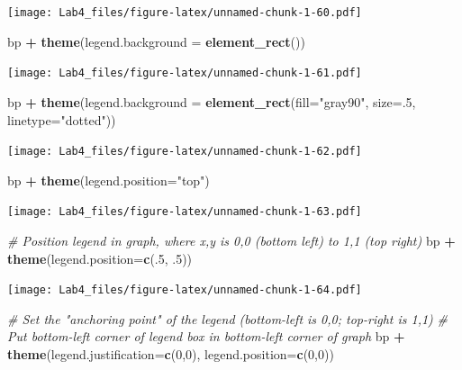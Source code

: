 \documentclass[]{article}
\newenvironment{Shaded}{\begin{snugshade}}{\end{snugshade}}
\newcommand{\KeywordTok}[1]{\textcolor[rgb]{0.13,0.29,0.53}{\textbf{#1}}}
\newcommand{\DataTypeTok}[1]{\textcolor[rgb]{0.13,0.29,0.53}{#1}}
\newcommand{\DecValTok}[1]{\textcolor[rgb]{0.00,0.00,0.81}{#1}}
\newcommand{\StringTok}[1]{\textcolor[rgb]{0.31,0.60,0.02}{#1}}
\newcommand{\CommentTok}[1]{\textcolor[rgb]{0.56,0.35,0.01}{\textit{#1}}}
\newcommand{\OperatorTok}[1]{\textcolor[rgb]{0.81,0.36,0.00}{\textbf{#1}}}
\newcommand{\NormalTok}[1]{#1}
\begin{document}
\texttt{[image: Lab4\_files/figure-latex/unnamed-chunk-1-60.pdf]}

\begin{Shaded}
\begin{Highlighting}[]
\NormalTok{bp }\OperatorTok{+}\StringTok{ }\KeywordTok{theme}\NormalTok{(}\DataTypeTok{legend.background =} \KeywordTok{element_rect}\NormalTok{())}
\end{Highlighting}
\end{Shaded}

\texttt{[image: Lab4\_files/figure-latex/unnamed-chunk-1-61.pdf]}

\begin{Shaded}
\begin{Highlighting}[]
\NormalTok{bp }\OperatorTok{+}\StringTok{ }\KeywordTok{theme}\NormalTok{(}\DataTypeTok{legend.background =} \KeywordTok{element_rect}\NormalTok{(}\DataTypeTok{fill=}\StringTok{"gray90"}\NormalTok{, }\DataTypeTok{size=}\NormalTok{.}\DecValTok{5}\NormalTok{, }\DataTypeTok{linetype=}\StringTok{"dotted"}\NormalTok{))}
\end{Highlighting}
\end{Shaded}

\texttt{[image: Lab4\_files/figure-latex/unnamed-chunk-1-62.pdf]}

\begin{Shaded}
\begin{Highlighting}[]
\NormalTok{bp }\OperatorTok{+}\StringTok{ }\KeywordTok{theme}\NormalTok{(}\DataTypeTok{legend.position=}\StringTok{"top"}\NormalTok{)}
\end{Highlighting}
\end{Shaded}

\texttt{[image: Lab4\_files/figure-latex/unnamed-chunk-1-63.pdf]}

\begin{Shaded}
\begin{Highlighting}[]
\CommentTok{# Position legend in graph, where x,y is 0,0 (bottom left) to 1,1 (top right)}
\NormalTok{bp }\OperatorTok{+}\StringTok{ }\KeywordTok{theme}\NormalTok{(}\DataTypeTok{legend.position=}\KeywordTok{c}\NormalTok{(.}\DecValTok{5}\NormalTok{, .}\DecValTok{5}\NormalTok{))}
\end{Highlighting}
\end{Shaded}

\texttt{[image: Lab4\_files/figure-latex/unnamed-chunk-1-64.pdf]}

\begin{Shaded}
\begin{Highlighting}[]
\CommentTok{# Set the "anchoring point" of the legend (bottom-left is 0,0; top-right is 1,1)}
\CommentTok{# Put bottom-left corner of legend box in bottom-left corner of graph}
\NormalTok{bp }\OperatorTok{+}\StringTok{ }\KeywordTok{theme}\NormalTok{(}\DataTypeTok{legend.justification=}\KeywordTok{c}\NormalTok{(}\DecValTok{0}\NormalTok{,}\DecValTok{0}\NormalTok{), }\DataTypeTok{legend.position=}\KeywordTok{c}\NormalTok{(}\DecValTok{0}\NormalTok{,}\DecValTok{0}\NormalTok{))}
\end{Highlighting}
\end{Shaded}
\end{document}
